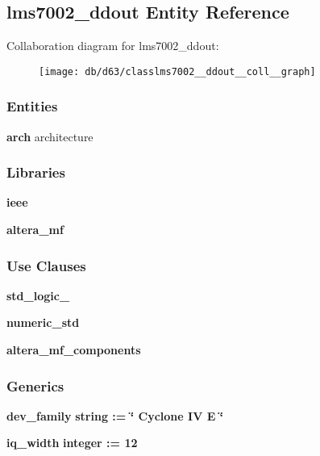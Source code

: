 \subsection{lms7002\+\_\+ddout Entity Reference}
\label{classlms7002__ddout}


Collaboration diagram for lms7002\+\_\+ddout\+:\nopagebreak
\begin{figure}[H]
\begin{center}
\leavevmode
\texttt{[image: db/d63/classlms7002\_\_ddout\_\_coll\_\_graph]}
\end{center}
\end{figure}
\subsubsection*{Entities}
\begin{DoxyCompactItemize}
\item 
{\bf arch} architecture
\end{DoxyCompactItemize}
\subsubsection*{Libraries}
 \begin{DoxyCompactItemize}
\item 
{\bf ieee} 
\item 
{\bf altera\+\_\+mf} 
\end{DoxyCompactItemize}
\subsubsection*{Use Clauses}
 \begin{DoxyCompactItemize}
\item 
{\bf std\+\_\+logic\+\_}   
\item 
{\bf numeric\+\_\+std}   
\item 
{\bf altera\+\_\+mf\+\_\+components}   
\end{DoxyCompactItemize}
\subsubsection*{Generics}
 \begin{DoxyCompactItemize}
\item 
{\bf dev\+\_\+family} {\bfseries {\bfseries \textcolor{comment}{string}\textcolor{vhdlchar}{ }\textcolor{vhdlchar}{ }\textcolor{vhdlchar}{\+:}\textcolor{vhdlchar}{=}\textcolor{vhdlchar}{ }\textcolor{vhdlchar}{ }\textcolor{vhdlchar}{ }\textcolor{vhdlchar}{ }\textcolor{keyword}{\char`\"{} Cyclone I\+V E \char`\"{}}\textcolor{vhdlchar}{ }}}
\item 
{\bf iq\+\_\+width} {\bfseries {\bfseries \textcolor{comment}{integer}\textcolor{vhdlchar}{ }\textcolor{vhdlchar}{ }\textcolor{vhdlchar}{\+:}\textcolor{vhdlchar}{=}\textcolor{vhdlchar}{ }\textcolor{vhdlchar}{ } \textcolor{vhdldigit}{12} \textcolor{vhdlchar}{ }}}
\end{DoxyCompactItemize}
